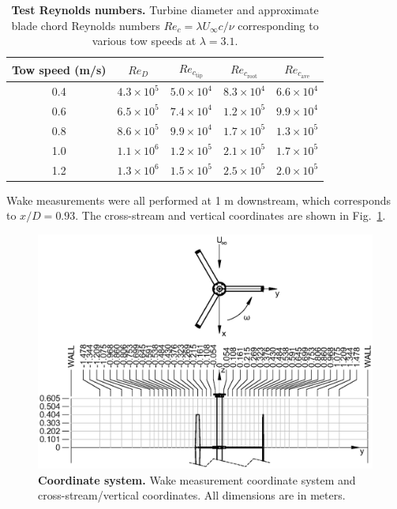 \documentclass[10pt,letterpaper]{article}
\begin{document}
\begin{table}[ht]
\centering
\begin{tabular}{c|c|c|c|c}
Tow speed (m/s) & $Re_D$ & $Re_{c_\mathrm{tip}}$ & $Re_{c_\mathrm{root}}$ & $Re_{c_\mathrm{ave}}$\\ 
\hline 
0.4 & $4.3 \times 10^5$ & $5.0 \times 10^4$ & $8.3 \times 10^4$ & $6.6 \times 10^4$ \\ 
0.6 & $6.5 \times 10^5$ & $7.4 \times 10^4$ & $1.2 \times 10^5$ & $9.9 \times 10^4$ \\ 
0.8 & $8.6 \times 10^5$ & $9.9 \times 10^4$ & $1.7 \times 10^5$ & $1.3 \times 10^5$ \\ 
1.0 & $1.1 \times 10^6$ & $1.2 \times 10^5$ & $2.1 \times 10^5$ & $1.7 \times 10^5$ \\ 
1.2 & $1.3 \times 10^6$ & $1.5 \times 10^5$ & $2.5 \times 10^5$ & $2.0 \times 10^5$ \\ 
\end{tabular} 

\caption{{\bf Test Reynolds numbers.} Turbine diameter and approximate blade
    chord Reynolds numbers $Re_c=\lambda U_\infty c / \nu$ corresponding to various
    tow speeds at $\lambda=3.1$.}

\label{tab:re}
\end{table}


Wake measurements were all performed at 1 m downstream, which corresponds to
$x/D = 0.93$. The cross-stream and vertical coordinates are shown in
Fig.~\ref{fig:coordinates}.

\begin{figure}[h]
\includegraphics[width=\textwidth]{figures/turbine_coordinate_system}
\caption{{\bf Coordinate system.} Wake measurement coordinate system and 
cross-stream/vertical coordinates. All dimensions are in meters.} 
\label{fig:coordinates}
\end{figure}
\end{document}
